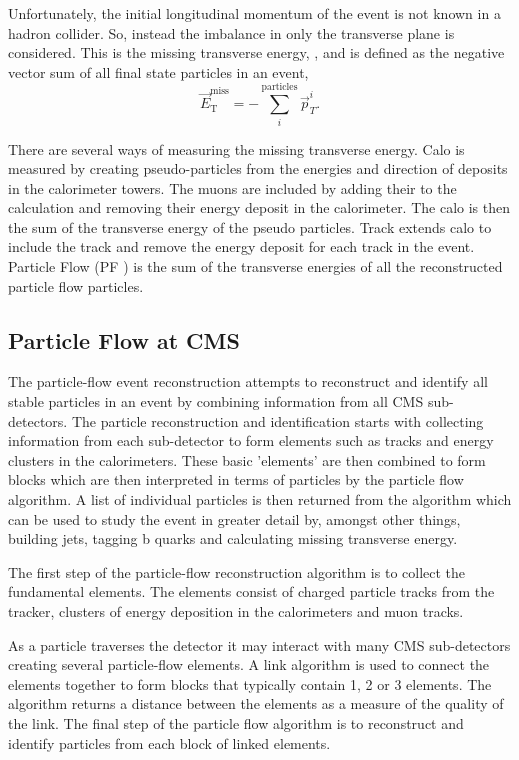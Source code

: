 Unfortunately, the initial longitudinal momentum of the event is not known in a
hadron collider. So, instead the imbalance in only the transverse plane is
considered. This is the missing transverse energy, \ETm, and is defined as
the negative vector sum of all final state particles in an event,
\begin{equation}
\vec{E}^{\text{miss}}_{\text{T}} = -\sum_i^{\text{particles}} \vec{p}_{T}^{i}.
\end{equation}

There are several ways of measuring the missing transverse energy.
Calo \ETm is measured by creating pseudo-particles from the energies and
direction of deposits in the calorimeter towers. The muons are included by
adding their \Pt to the calculation and removing their energy deposit in the
calorimeter. The calo \ETm is then the sum of the transverse energy of the
pseudo particles.
Track \ETm extends calo \ETm to include the track \Pt and remove the energy
deposit for each track in the event.
Particle Flow \ETm (PF \ETm) is the sum of the transverse energies of all the
reconstructed particle flow particles.\cite{PF}

\subsection{Particle Flow at CMS}

The particle-flow event reconstruction attempts to reconstruct and identify all
stable particles in an event by combining information from all CMS
sub-detectors. The particle reconstruction and identification starts with
collecting information from each sub-detector to form elements such as tracks
and energy clusters in the calorimeters. These basic 'elements' are then
combined to form blocks which are then interpreted in terms of particles by the
particle flow algorithm. A list of individual particles is then returned from
the algorithm which can be used to study the event in greater detail by,
amongst other things, building jets, tagging b quarks and calculating missing
transverse energy.\cite{PF}

The first step of the particle-flow reconstruction algorithm is to collect the
fundamental elements. The elements consist of charged particle tracks from the
tracker, clusters of energy deposition in the calorimeters and muon tracks.

As a particle traverses the detector it may interact with many CMS sub-detectors
creating several particle-flow elements. A link algorithm is used to connect
the elements together to form blocks that typically contain 1, 2 or 3 elements.
The algorithm returns a distance between the elements as a measure of the
quality of the link. The final step of the particle flow algorithm is to
reconstruct and identify particles from each block of linked elements.\cite{PF}

